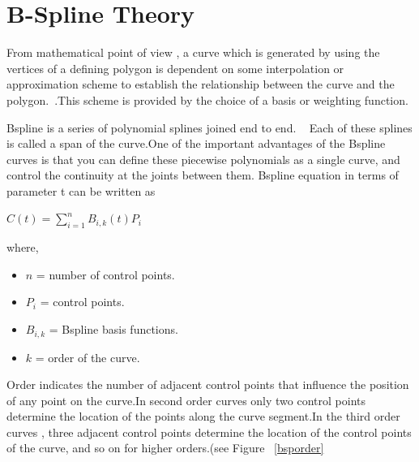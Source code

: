     \chapter{B-Spline Theory} \label{appbsp}

        From mathematical point of view , a curve which is generated by using
        the vertices of a defining polygon is dependent on some interpolation
        or approximation scheme to establish the relationship between the
        curve and the polygon.~\cite{Roger}.This scheme is provided by the
        choice of a basis or weighting function.

        Bspline is a series of polynomial splines joined end to end.
        ~\cite{PHIGS}
        Each of these splines is called a span of the curve.One of the important
        advantages of the Bspline curves is that you can define these piecewise
        polynomials as a single curve, and control the continuity at the joints
        between them.
        Bspline equation in terms of parameter t can be written as

            $ C(t) = \sum_{i=1}^{n}B_{i,k}(t)P_{i} $

        where,\begin{itemize}
            \item
            $n$         =   number of control points.
            \item
            $P_{i}$     =   control points.
            \item
            $B_{i,k}$   =   Bspline basis functions.
            \item
            $k$         =   order of the curve.
            \end{itemize}
            Order indicates the number of adjacent control points that influence
            the position of any point on the curve.In second order curves only
            two control points determine the location of the points along the
            curve segment.In the third order curves , three adjacent control
            points determine the location of the control points of the curve,
            and so on for higher orders.(see Figure ~\ref{bsporder}

